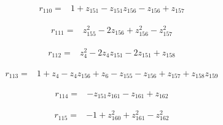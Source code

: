 \par\noindent\begin{minipage}{\linewidth}
\begin{align*}
r_{110}={}&1+z_{151}-z_{151}z_{156}-z_{156}+z_{157}
\end{align*}
\end{minipage}\par
\par\noindent\begin{minipage}{\linewidth}
\begin{align*}
r_{111}={}&z_{155}^{2}-2z_{156}+z_{156}^{2}-z_{157}^{2}
\end{align*}
\end{minipage}\par
\par\noindent\begin{minipage}{\linewidth}
\begin{align*}
r_{112}={}&z_{4}^{2}-2z_{4}z_{151}-2z_{151}+z_{158}
\end{align*}
\end{minipage}\par
\par\noindent\begin{minipage}{\linewidth}
\begin{align*}
r_{113}={}&1+z_{4}-z_{4}z_{156}+z_{6}-z_{155}-z_{156}+z_{157}+z_{158}z_{159}
\end{align*}
\end{minipage}\par
\par\noindent\begin{minipage}{\linewidth}
\begin{align*}
r_{114}={}&-z_{151}z_{161}-z_{161}+z_{162}
\end{align*}
\end{minipage}\par
\par\noindent\begin{minipage}{\linewidth}
\begin{align*}
r_{115}={}&-1+z_{160}^{2}+z_{161}^{2}-z_{162}^{2}
\end{align*}
\end{minipage}\par
